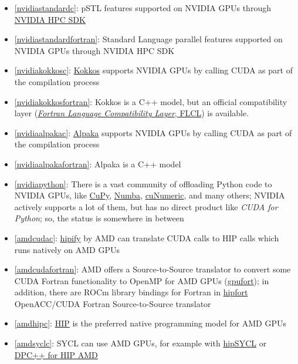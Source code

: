 \begin{frame}[allowframebreaks]
\begin{itemize}
        \item \ref{nvidiastandardc}: pSTL features supported on NVIDIA GPUs through \href{https://docs.nvidia.com/hpc-sdk/compilers/c++-parallel-algorithms/}{NVIDIA HPC SDK}
        \item \ref{nvidiastandardfortran}: Standard Language parallel features supported on NVIDIA GPUs through NVIDIA HPC SDK
        \item \ref{nvidiakokkosc}: \href{https://github.com/kokkos/kokkos}{Kokkos} supports NVIDIA GPUs by calling CUDA as part of the compilation process
        \item \ref{nvidiakokkosfortran}: Kokkos is a C++ model, but an official compatibility layer (\href{https://github.com/kokkos/kokkos-fortran-interop}{\emph{Fortran Language Compatibility Layer}, FLCL}) is available.
        \item \ref{nvidiaalpakac}: \href{https://github.com/alpaka-group/alpaka}{Alpaka} supports NVIDIA GPUs by calling CUDA as part of the compilation process
        \item \ref{nvidiaalpakafortran}: Alpaka is a C++ model
        \item \ref{nvidiapython}: There is a vast community of offloading Python code to NVIDIA GPUs, like \href{https://cupy.dev/}{CuPy}, \href{https://numba.pydata.org/}{Numba}, \href{https://developer.nvidia.com/cunumeric}{cuNumeric}, and many others; NVIDIA actively supports a lot of them, but has no direct product like \emph{CUDA for Python}; so, the status is somewhere in between
        \item \ref{amdcudac}: \href{https://github.com/ROCm-Developer-Tools/HIPIFY}{hipify} by AMD can translate CUDA calls to HIP calls which runs natively on AMD GPUs
        \item \ref{amdcudafortran}: AMD offers a Source-to-Source translator to convert some CUDA Fortran functionality to OpenMP for AMD GPUs (\href{https://github.com/ROCmSoftwarePlatform/gpufort}{gpufort}); in addition, there are ROCm library bindings for Fortran in \href{https://github.com/ROCmSoftwarePlatform/hipfort}{hipfort} OpenACC/CUDA Fortran Source-to-Source translator
        \item \ref{amdhipc}: \href{https://github.com/ROCm-Developer-Tools/HIP}{HIP} is the preferred native programming model for AMD GPUs
        \item \ref{amdsyclc}: SYCL can use AMD GPUs, for example with \href{https://github.com/illuhad/hipSYCL}{hipSYCL} or \href{https://github.com/intel/llvm/blob/sycl/sycl/doc/GetStartedGuide.md\#build-dpc-toolchain-with-support-for-hip-amd}{DPC++ for HIP AMD}

\end{itemize}
\end{frame}
